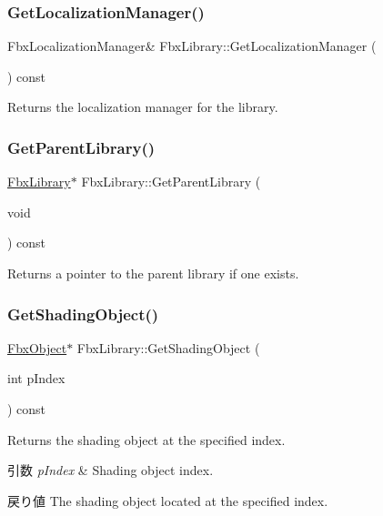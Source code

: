 \subsubsection{\texorpdfstring{Get\+Localization\+Manager()}{GetLocalizationManager()}}
{\footnotesize\ttfamily Fbx\+Localization\+Manager\& Fbx\+Library\+::\+Get\+Localization\+Manager (\begin{DoxyParamCaption}{ }\end{DoxyParamCaption}) const}

Returns the localization manager for the library. \mbox{\label{class_fbx_library_a8733a34df39aefd786bd792ee646d3ca}} 
\subsubsection{\texorpdfstring{Get\+Parent\+Library()}{GetParentLibrary()}}
{\footnotesize\ttfamily \hyperlink{class_fbx_library}{Fbx\+Library}$\ast$ Fbx\+Library\+::\+Get\+Parent\+Library (\begin{DoxyParamCaption}\item[{void}]{ }\end{DoxyParamCaption}) const}



Returns a pointer to the parent library if one exists. 

\mbox{\label{class_fbx_library_ae7783de818ed0eca3fa34ff6378685fb}} 
\subsubsection{\texorpdfstring{Get\+Shading\+Object()}{GetShadingObject()}\hspace{0.1cm}{\footnotesize\ttfamily [1/2]}}
{\footnotesize\ttfamily \hyperlink{class_fbx_object}{Fbx\+Object}$\ast$ Fbx\+Library\+::\+Get\+Shading\+Object (\begin{DoxyParamCaption}\item[{int}]{p\+Index }\end{DoxyParamCaption}) const}

Returns the shading object at the specified index. 
\begin{DoxyParams}{引数}
{\em p\+Index} & Shading object index. \\
\hline
\end{DoxyParams}
\begin{DoxyReturn}{戻り値}
The shading object located at the specified index. 
\end{DoxyReturn}
\mbox{\label{class_fbx_library_a1eb2147612d1073d6afbf562adfe3c25}} 
